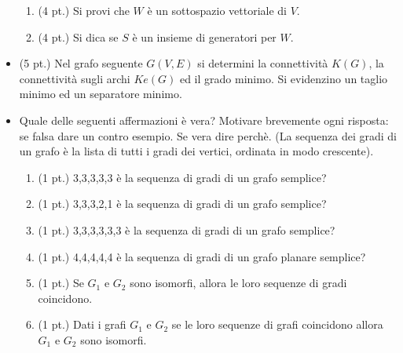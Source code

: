 \documentclass[12pt,a4paper]{article}
\begin{document}
\begin{itemize}[label=$\circ$]
    \begin{enumerate}
        \item (4 pt.) Si provi che $W$ è un sottospazio vettoriale di $V$.
        \item (4 pt.) Si dica se $S$ è un insieme di generatori per $W$.
    \end{enumerate}

    \item (5 pt.) Nel grafo seguente \( G(V,E) \) si determini la connettività \( K(G) \), la connettività sugli archi \( K e(G) \) ed il grado minimo. Si evidenzino un taglio minimo ed un separatore minimo. 

    \item Quale delle seguenti affermazioni è vera? Motivare brevemente ogni risposta: se falsa dare un contro esempio. Se vera dire perchè. (La sequenza dei gradi di un grafo è la lista di tutti i gradi dei vertici, ordinata in modo crescente).

    \begin{enumerate}
        \item (1 pt.) 3,3,3,3,3 è la sequenza di gradi di un grafo semplice?
        \item (1 pt.) 3,3,3,2,1 è la sequenza di gradi di un grafo semplice?
        \item (1 pt.) 3,3,3,3,3,3 è la sequenza di gradi di un grafo semplice?
        \item (1 pt.) 4,4,4,4,4 è la sequenza di gradi di un grafo planare semplice?
        \item (1 pt.) Se \( G_1 \) e \( G_2 \) sono isomorfi, allora le loro sequenze di gradi coincidono.
        \item (1 pt.) Dati i grafi \( G_1 \) e \( G_2 \) se le loro sequenze di grafi coincidono allora \( G_1 \) e \( G_2 \) sono isomorfi.
    \end{enumerate}

\end{itemize}
\end{document}
